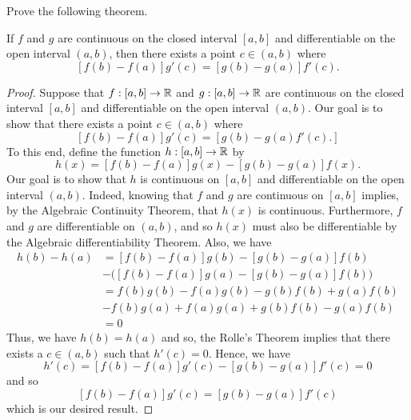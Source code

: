\documentclass[a4paper]{article}
\begin{document}
\begin{problem}
    Prove the following theorem.
\end{problem}
\begin{theorem}
    If \( f \) and \( g  \) are continuous on the closed interval \( [a,b] \) and differentiable on the open interval \( (a,b) \), then there exists a point \( c \in (a,b) \) where 
    \[ [f(b) - f(a)]g'(c) = [g(b)- g(a)]f'(c). \]
\end{theorem}
\begin{proof}
    Suppose that \( f: [a,b] \to \mathbb{R}   \) and \( g: [a,b] \to \mathbb{R}   \) are continuous on the closed interval \( [a,b] \) and differentiable on the open interval \( (a,b) \). Our goal is to show that there exists a point \( c \in (a,b) \) where 
    \[  [f(b) - f(a)]g'(c) = [g(b) - g(a) f'(c).] \]
    To this end, define the function \( h : [a,b] \to \mathbb{R}  \) by \[ h(x) = [f(b)-f(a)]g(x) - [g(b)-g(a)]f(x) .\] Our goal is to show that \( h  \) is continuous on \( [a,b] \) and differentiable on the open interval \( (a,b) \). Indeed, knowing that \( f  \) and \( g  \) are continuous on \( [a,b] \) implies, by the Algebraic Continuity Theorem, that \( h(x) \) is continuous. Furthermore, \( f  \) and \( g  \) are differentiable on \( (a,b) \), and so \( h(x) \) must also be differentiable by the Algebraic differentiability Theorem. Also, we have 
    \begin{align*}
        h(b) - h(a) &= [f(b) - f(a)]g(b) - [g(b) - g(a)]f(b) \\ 
                    &- \Big(  [f(b) - f(a)] g(a) - [g(b)-g(a)]f(b) \Big)  \\
                    &= f(b)g(b) - f(a)g(b) - g(b)f(b) + g(a)f(b)  \\
                    &- f(b)g(a) + f(a)g(a) + g(b)f(b) - g(a)f(b) \\
                    &= 0 
    \end{align*}
    Thus, we have \( h(b) = h(a) \) and so, the Rolle's Theorem implies that there exists a \( c \in (a,b)  \) such that \( h'(c) =  0 \). Hence, we have 
    \[ h'(c) = [f(b) - f(a)]g'(c) - [g(b) - g(a)]f'(c) = 0   \]
    and so 
    \[  [f(b) - f(a)]g'(c) = [g(b) - g(a)]f'(c) \]
    which is our desired result.
\end{proof}
\end{document}
